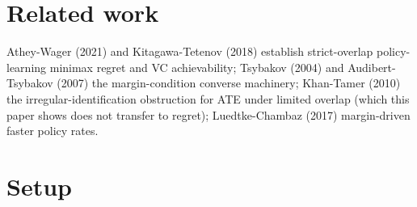 \documentclass{article}
\begin{document}
\section{Related work}

Athey-Wager (2021) and Kitagawa-Tetenov (2018) establish strict-overlap policy-learning minimax regret and VC achievability; Tsybakov (2004) and Audibert-Tsybakov (2007) the margin-condition converse machinery; Khan-Tamer (2010) the irregular-identification obstruction for ATE under limited overlap (which this paper shows does not transfer to regret); Luedtke-Chambaz (2017) margin-driven faster policy rates.

\section{Setup}
\end{document}
